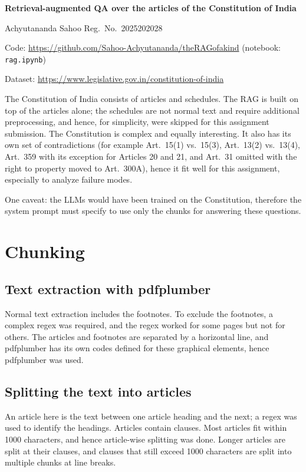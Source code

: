 \documentclass[11pt,a4paper]{article}
\begin{document}
\begin{center}
{\LARGE\bfseries Retrieval-augmented QA over the articles of the Constitution of India}\par\vspace{0.6em}
{Achyutananda Sahoo \quad\textbullet\quad Reg.\ No.\ 2025202028}\par\vspace{0.3em}
{\small Code: \url{https://github.com/Sahoo-Achyutananda/theRAGofakind} (notebook: \texttt{rag.ipynb})}\par\vspace{0.1em}
{\small Dataset: \url{https://www.legislative.gov.in/constitution-of-india}}\par
\end{center}
\vspace{0.4em}

The Constitution of India consists of articles and schedules. The RAG is built on top of the articles alone; the schedules are not normal text and require additional preprocessing, and hence, for simplicity, were skipped for this assignment submission. The Constitution is complex and equally interesting. It also has its own set of contradictions (for example Art.~15(1) vs.\ 15(3), Art.~13(2) vs.\ 13(4), Art.~359 with its exception for Articles 20 and 21, and Art.~31 omitted with the right to property moved to Art.~300A), hence it fit well for this assignment, especially to analyze failure modes.

One caveat: the LLMs would have been trained on the Constitution, therefore the system prompt must specify to use only the chunks for answering these questions.

\section{Chunking}

\subsection{Text extraction with pdfplumber}
Normal text extraction includes the footnotes. To exclude the footnotes, a complex regex was required, and the regex worked for some pages but not for others. The articles and footnotes are separated by a horizontal line, and pdfplumber has its own codes defined for these graphical elements, hence pdfplumber was used.

\subsection{Splitting the text into articles}
An article here is the text between one article heading and the next; a regex was used to identify the headings. Articles contain clauses. Most articles fit within 1000 characters, and hence article-wise splitting was done. Longer articles are split at their clauses, and clauses that still exceed 1000 characters are split into multiple chunks at line breaks.
\end{document}
